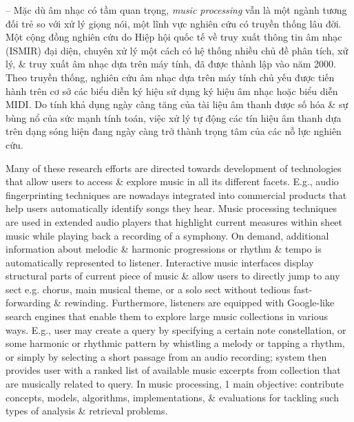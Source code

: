 \documentclass{article}
\begin{document}
\begin{itemize}
	-- Mặc dù âm nhạc có tầm quan trọng, {\it music processing} vẫn là một ngành tương đối trẻ so với xử lý giọng nói, một lĩnh vực nghiên cứu có truyền thống lâu đời. Một cộng đồng nghiên cứu do Hiệp hội quốc tế về truy xuất thông tin âm nhạc (ISMIR) đại diện, chuyên xử lý một cách có hệ thống nhiều chủ đề phân tích, xử lý, \& truy xuất âm nhạc dựa trên máy tính, đã được thành lập vào năm 2000. Theo truyền thống, nghiên cứu âm nhạc dựa trên máy tính chủ yếu được tiến hành trên cơ sở các biểu diễn ký hiệu sử dụng ký hiệu âm nhạc hoặc biểu diễn MIDI. Do tính khả dụng ngày càng tăng của tài liệu âm thanh được số hóa \& sự bùng nổ của sức mạnh tính toán, việc xử lý tự động các tín hiệu âm thanh dựa trên dạng sóng hiện đang ngày càng trở thành trọng tâm của các nỗ lực nghiên cứu.
	
	Many of these research efforts are directed towards development of technologies that allow users to access \& explore music in all its different facets. E.g., audio fingerprinting techniques are nowadays integrated into commercial products that help users automatically identify songs they hear. Music processing techniques are used in extended audio players that highlight current measures within sheet music while playing back a recording of a symphony. On demand, additional information about melodic \& harmonic progressions or rhythm \& tempo is automatically represented to listener. Interactive music interfaces display structural parts of current piece of music \& allow users to directly jump to any sect e.g. chorus, main musical theme, or a solo sect without tedious fast-forwarding \& rewinding. Furthermore, listeners are equipped with Google-like search engines that enable them to explore large music collections in various ways. E.g., user may create a query by specifying a certain note constellation, or some harmonic or rhythmic pattern by whistling a melody or tapping a rhythm, or simply by selecting a short passage from an audio recording; system then provides user with a ranked list of available music excerpts from collection that are musically related to query. In music processing, 1 main objective: contribute concepts, models, algorithms, implementations, \& evaluations for tackling such types of analysis \& retrieval problems.
	

\end{itemize}
\end{document}
